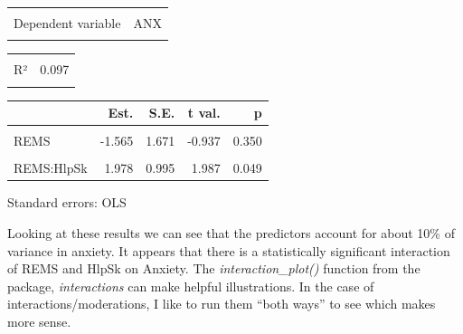 \documentclass[
  english,
]{book}
\begin{document}
\begin{table}[!h]
\centering
\begin{tabular}{lr}
\toprule
\cellcolor{gray!6}{Observations} & \cellcolor{gray!6}{156}\\
Dependent variable & ANX\\
\cellcolor{gray!6}{Type} & \cellcolor{gray!6}{OLS linear regression}\\
\bottomrule
\end{tabular}
\end{table} \begin{table}[!h]
\centering
\begin{tabular}{lr}
\toprule
\cellcolor{gray!6}{F(3,152)} & \cellcolor{gray!6}{5.426}\\
R² & 0.097\\
\cellcolor{gray!6}{Adj. R²} & \cellcolor{gray!6}{0.079}\\
\bottomrule
\end{tabular}
\end{table} \begin{table}[!h]
\centering
\begin{threeparttable}
\begin{tabular}{lrrrr}
\toprule
  & Est. & S.E. & t val. & p\\
\midrule
\cellcolor{gray!6}{(Intercept)} & \cellcolor{gray!6}{3.262} & \cellcolor{gray!6}{0.613} & \cellcolor{gray!6}{5.325} & \cellcolor{gray!6}{0.000}\\
REMS & -1.565 & 1.671 & -0.937 & 0.350\\
\cellcolor{gray!6}{HlpSk} & \cellcolor{gray!6}{-0.518} & \cellcolor{gray!6}{0.361} & \cellcolor{gray!6}{-1.433} & \cellcolor{gray!6}{0.154}\\
REMS:HlpSk & 1.978 & 0.995 & 1.987 & 0.049\\
\bottomrule
\end{tabular}
\begin{tablenotes}
\item Standard errors: OLS
\end{tablenotes}
\end{threeparttable}
\end{table}

Looking at these results we can see that the predictors account for about 10\% of variance in anxiety. It appears that there is a statistically significant interaction of REMS and HlpSk on Anxiety. The \emph{interaction\_plot()} function from the package, \emph{interactions} can make helpful illustrations. In the case of interactions/moderations, I like to run them ``both ways'' to see which makes more sense.
\end{document}
